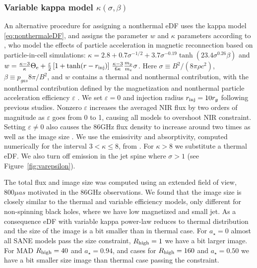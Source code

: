 \subsubsection{Variable kappa model $\kappa(\sigma,\beta)$}


An alternative procedure for assigning a nonthermal eDF uses the  kappa model \eqref{eq:nonthermaleDF}, and assigns the parameter $w$  and $\kappa$ parameters according to \cite{2018ApJ...862...80B}, who model the effects of particle acceleration in magnetic reconnection based on particle-in-cell simulations: $ \kappa=2.8 +0.7\sigma^{-1/2} + 3.7\sigma^{-0.19}\tanh{(23.4\sigma^{0.26} \beta)}\label{eq:kappa}$
and $w= \frac{ \kappa -3 }{\kappa} \Theta_{\rm e} + \frac{\varepsilon}{2}\left[1+\tanh(r-r_{\rm inj})\right]\, \frac{ \kappa -3 }{6 \kappa} \frac{m_{\rm p}}{m_{\rm e}} \sigma$.
Here $\sigma \equiv B^2/(8\pi\rho c^2)$, $\beta \equiv p_{gas} 8 \pi/B^2$, and $w$ contains a thermal and nonthermal contribution, with the nonthermal contribution defined by the magnetization and nonthermal particle acceleration efficiency $\varepsilon$  \citep{2019A&A...632A...2D, 2021NatAs.tmp..218C}. We set  $\varepsilon=0$ and injection radius $r_{\rm inj}=10r_{g}$ following previous studies.  Nonzero $\varepsilon$ increases the averaged NIR flux by two orders of magnitude as $\varepsilon$ goes from 0 to 1, causing all models to overshoot NIR constraint.  Setting $\varepsilon \ne 0$ also causes the 86GHz flux density to increase around two times as well as the image size \citep{2021arXiv211102518F}. We use the emissivity and absorptivity, computed numerically for the interval $3 < \kappa \le 8$, from  \cite{2016ApJ...822...34P}. For $\kappa > 8$ we substitute a thermal eDF.  We also turn off emission in the jet spine where $\sigma > 1$ (see Figure~\ref{fig:varepsilon}).




The total flux and image size was computed using an extended field of view, $800 \mu as$ motivated in the 86GHz observations. We found that the image size is closely similar to the thermal and variable efficiency models, only different for non-spinning black holes, where we have low magnetized and small jet. As a consequence eDF with variable kappa power-law reduces to thermal distribution and the size of the image is a bit smaller than in thermal case. For $a_{\star}=0$ almost all SANE models pass the size constraint, $R_{\rm high}=1$ we have a bit larger image. For MAD $R_{\rm high}=40$ and $a_{\star}=0.94$, and cases for $R_{\rm high}=160$ and $a_{\star}=0.50$ we have a bit smaller size image than thermal case passing the constraint.

